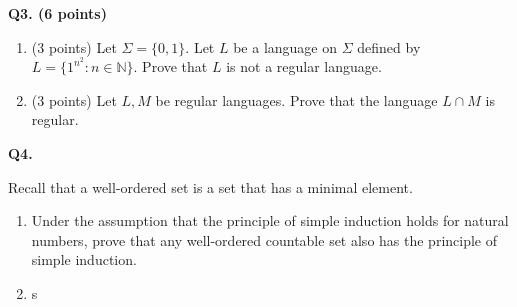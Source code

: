 \documentclass{article}
\begin{document}
    \newpage

    \textbf{Q3. (6 points)}

    \begin{enumerate}[label=\alph*)]
        \item (3 points) Let \(\Sigma = \{0, 1\}\). Let \(L\) be a language on \(\Sigma\) defined by \(L = \{1^{n^2} : n \in \mathbb{N}\}\). Prove that \(L\) is not a regular language.
        \vfill
        \item (3 points) Let \(L, M\) be regular languages. Prove that the language \(L \cap M\) is regular.
        \vfill
    \end{enumerate}

    \newpage

    \textbf{Q4.}

    Recall that a well-ordered set is a set that has a minimal element.
    
    \begin{enumerate}[label=\alph*)]
        \item Under the assumption that the principle of simple induction holds for natural numbers, prove that any well-ordered countable set also has the principle of simple induction.
        \vfill
        \item s
    \end{enumerate}
\end{document}
